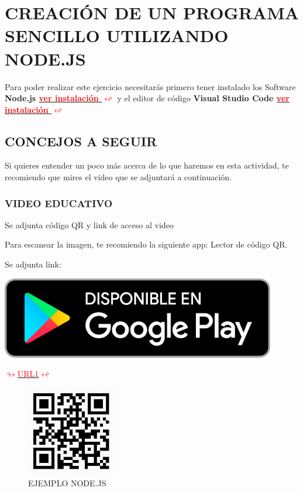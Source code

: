 \section{CREACIÓN DE UN PROGRAMA SENCILLO
UTILIZANDO NODE.JS }
\hypertarget{EJEMPLONODE}{
Para poder realizar este ejercicio necesitarás primero tener instalado los Software \textbf{ Node.js \hyperlink{instalarnode}{\textcolor{red}{ver instalación} \textcolor{red}{$\looparrowleft$}}} y el  editor de código \textbf{Visual Studio Code \hyperlink{instalarcode}{\textcolor{red}{ver instalación} \textcolor{red}{$\looparrowleft$}}}}


\subsection{CONCEJOS A SEGUIR}
Si quieres entender un poco más acerca de lo que haremos en esta actividad, te recomiendo que mires el video que se adjuntará a continuación.
\subsubsection{VIDEO EDUCATIVO}
 Se adjunta código QR y link de acceso al video

Para escanear la imagen, te recomiendo la siguiente app: Lector de código QR.

Se adjunta link:
 \begin{minipage}[c]{0,19 \textwidth}
 \href{https://play.google.com/store/apps/details?id=com.teacapps.barcodescanner}{
 \includegraphics[width=0.9\textwidth]{img/google play.png}
 }\end{minipage}
 \hyperlink{linkapp}{\textcolor{red}{$\looparrowright$URL1$\looparrowleft$}}
\begin{center}
 \begin{figure}[H]
 \centering
\includegraphics[width=0.35\textwidth]{img/QR1.jpeg}
 \caption{EJEMPLO NODE.JS}
 \label{fig:NODEQR}
\end{figure}
\end{center}

